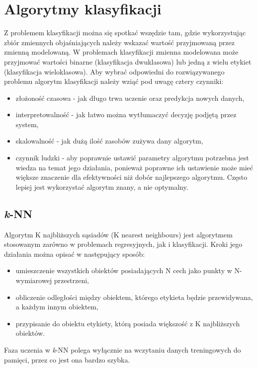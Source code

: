 \section{Algorytmy klasyfikacji}
Z problemem klasyfikacji można się spotkać wszędzie tam, gdzie wykorzystując
zbiór zmiennych objaśniających należy wskazać wartość przyjmowaną przez zmienną
modelowaną. W problemach klasyfikacji zmienna modelowana może przyjmować wartości
binarne (klasyfikacja dwuklasowa) lub jedną z wielu etykiet (klasyfikacja wieloklasowa).
Aby wybrać odpowiedni do rozwiązywanego problemu algorytm klasyfikacji należy wziąć 
pod uwagę cztery czynniki:
\begin{itemize}
    \item złożoność czasowa - jak długo trwa uczenie oraz predykcja nowych danych,
    \item interpretowalność - jak łatwo można wytłumaczyć decyzję podjętą przez 
    system,
    \item skalowalność - jak dużą ilość zasobów zużywa dany algorytm,
    \item czynnik ludzki - aby poprawnie ustawić parametry algorytmu potrzebna
    jest wiedza na temat jego działania, ponieważ poprawne ich ustawienie może 
    mieć większe znaczenie dla efektywności niż dobór najlepszego algorytmu. Często
    lepiej jest wykorzystać algorytm znany, a nie optymalny.
\end{itemize}

\subsection{\textit{k}-NN}

Algorytm K najbliższych sąsiadów (K nearest neighbours) jest algorytmem
stosowanym zarówno w problemach regresyjnych, jak i klasyfikacji. Kroki jego działania
można opisać w następujący sposób:
\begin{itemize}
    \item umieszczenie wszystkich obiektów posiadających N cech jako punkty w N-wymiarowej przestrzeni,
    \item obliczenie odległości między obiektem, którego etykieta będzie przewidywana, a każdym innym
    obiektem,
    \item przypisanie do obiektu etykiety, którą posiada większość z K najbliższych obiektów. 
\end{itemize}
Faza uczenia w \textit{k}-NN polega wyłącznie na wczytaniu danych treningowych do pamięci, przez co jest 
ona bardzo szybka.

